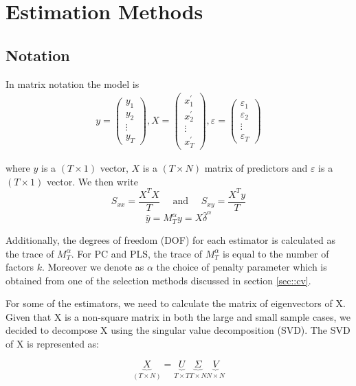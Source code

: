 \section{Estimation Methods}

\subsection{Notation}

In matrix notation the model is 
\begin{align*}
y=\left(\begin{array}{c}
y_{1} \\
y_{2} \\
\vdots \\
y_{T}
\end{array}\right), X=\left(\begin{array}{c}
x_{1}^{\prime} \\
x_{2}^{\prime} \\
\vdots \\
x_{T}^{\prime}
\end{array}\right), \varepsilon=\left(\begin{array}{c}
\varepsilon_{1} \\
\varepsilon_{2} \\
\vdots \\
\varepsilon_{T}
\end{array}\right)
\end{align*}


where $y$ is a $(T \times 1)$ vector, $X$ is a $(T \times N)$ matrix of predictors and $\varepsilon$ is a $(T \times 1)$ vector. We then write 
\[S_{xx} = \frac{X^{T} X}{T} \quad \text{ and } \quad S_{xy} = \frac{X^{T} y}{T} \]
\[\widehat{y} = M_{T}^{\alpha} y = X \widehat{\delta}^{\alpha}\]

Additionally, the degrees of freedom (DOF) for each estimator is calculated as the trace of $M_{T}^{\alpha}$. For PC and PLS, the trace of $M_{T}^{\alpha}$ is equal to the number of factors $k$. Moreover we denote as $\alpha$ the choice of penalty parameter which is obtained from one of the selection methods discussed in section \ref{sec::cv}.

For some of the estimators, we need to calculate the matrix of eigenvectors of X. Given that X is a non-square matrix in both the large and small sample cases, we decided to decompose X using the singular value decomposition (SVD). The SVD of X is represented as:

\[\underbrace{X}_{(T \times N)} = \underbrace{U}_{T \times T} \underbrace{\Sigma}_{T \times N} \underbrace{V}_{N \times N}\]


